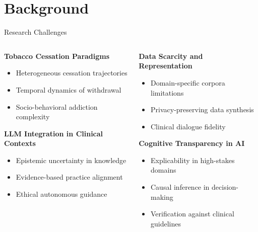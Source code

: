 \section{Background}



\begin{frame}{Research Challenges}
  \begin{columns}
    \begin{column}{0.5\textwidth}
      \textbf{Tobacco Cessation Paradigms}
      \begin{itemize}
        \item Heterogeneous cessation trajectories
        \item Temporal dynamics of withdrawal
        \item Socio-behavioral addiction complexity
      \end{itemize}
      \vspace{0.3cm}
      \textbf{LLM Integration in Clinical Contexts}
      \begin{itemize}
        \item Epistemic uncertainty in knowledge
        \item Evidence-based practice alignment
        \item Ethical autonomous guidance
      \end{itemize}
    \end{column}

    \begin{column}{0.5\textwidth}
      \textbf{Data Scarcity and Representation}
      \begin{itemize}
        \item Domain-specific corpora limitations
        \item Privacy-preserving data synthesis
        \item Clinical dialogue fidelity
      \end{itemize}
      \vspace{0.3cm}
      \textbf{Cognitive Transparency in AI}
      \begin{itemize}
        \item Explicability in high-stakes domains
        \item Causal inference in decision-making
        \item Verification against clinical guidelines
      \end{itemize}
    \end{column}
  \end{columns}
\end{frame}

